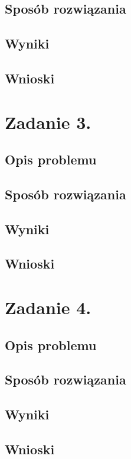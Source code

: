 \documentclass[12pt]{article}
\begin{document}
\subsection{Sposób rozwiązania}
\subsection{Wyniki}

\subsection{Wnioski}

\section{Zadanie 3.}

\subsection{Opis problemu}

\subsection{Sposób rozwiązania}

\subsection{Wyniki}

\subsection{Wnioski}

\section{Zadanie 4.}

\subsection{Opis problemu}
\subsection{Sposób rozwiązania}
\subsection{Wyniki}

\subsection{Wnioski}
\end{document}
